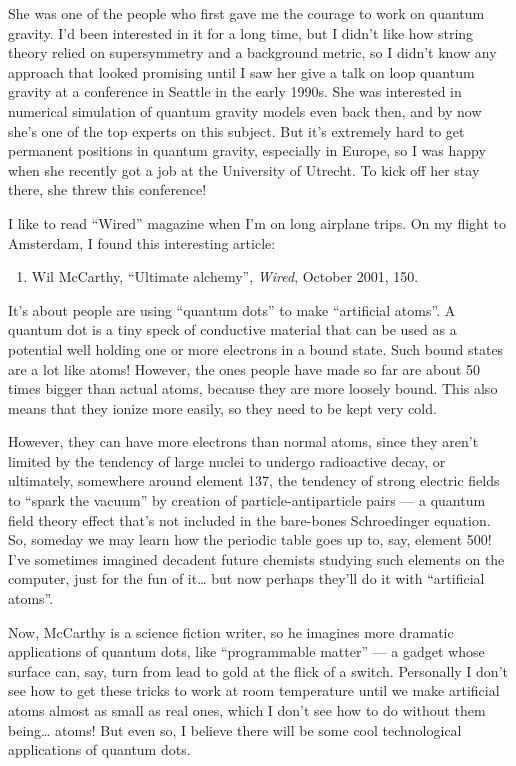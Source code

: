 \documentclass{article}
\def\tightlist{}
\begin{document}
She was one of the people who first gave me the courage to work on
quantum gravity. I'd been interested in it for a long time, but I didn't
like how string theory relied on supersymmetry and a background metric,
so I didn't know any approach that looked promising until I saw her give
a talk on loop quantum gravity at a conference in Seattle in the early
1990s. She was interested in numerical simulation of quantum gravity
models even back then, and by now she's one of the top experts on this
subject. But it's extremely hard to get permanent positions in quantum
gravity, especially in Europe, so I was happy when she recently got a
job at the University of Utrecht. To kick off her stay there, she threw
this conference!

I like to read ``Wired'' magazine when I'm on long airplane trips. On my
flight to Amsterdam, I found this interesting article:

\begin{enumerate}
\def\labelenumi{\arabic{enumi})}
\setcounter{enumi}{1}
\tightlist
\item
  Wil McCarthy, ``Ultimate alchemy'', \emph{Wired}, October 2001, 150.
\end{enumerate}

It's about people are using ``quantum dots'' to make ``artificial
atoms''. A quantum dot is a tiny speck of conductive material that can
be used as a potential well holding one or more electrons in a bound
state. Such bound states are a lot like atoms! However, the ones people
have made so far are about 50 times bigger than actual atoms, because
they are more loosely bound. This also means that they ionize more
easily, so they need to be kept very cold.

However, they can have more electrons than normal atoms, since they
aren't limited by the tendency of large nuclei to undergo radioactive
decay, or ultimately, somewhere around element 137, the tendency of
strong electric fields to ``spark the vacuum'' by creation of
particle-antiparticle pairs --- a quantum field theory effect that's not
included in the bare-bones Schroedinger equation. So, someday we may
learn how the periodic table goes up to, say, element 500! I've
sometimes imagined decadent future chemists studying such elements on
the computer, just for the fun of it\ldots{} but now perhaps they'll do
it with ``artificial atoms''.

Now, McCarthy is a science fiction writer, so he imagines more dramatic
applications of quantum dots, like ``programmable matter'' --- a gadget
whose surface can, say, turn from lead to gold at the flick of a switch.
Personally I don't see how to get these tricks to work at room
temperature until we make artificial atoms almost as small as real ones,
which I don't see how to do without them being\ldots{} atoms! But even
so, I believe there will be some cool technological applications of
quantum dots.
\end{document}
